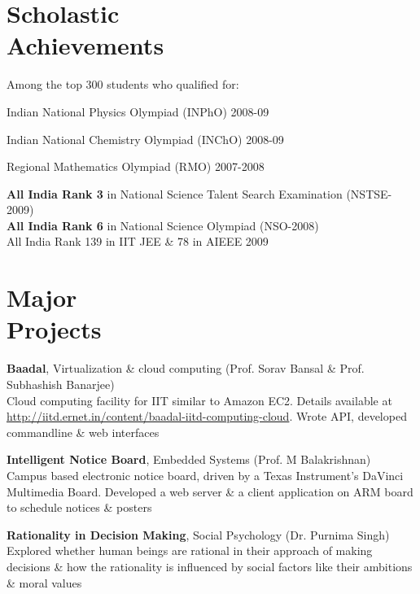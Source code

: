 \documentclass[margin,line]{resume}
\begin{document}
\begin{resume}
    \section{\mysidestyle Scholastic\\Achievements} 
    Among the top 300 students who qualified for:
    \begin{list2}
    \item Indian National Physics Olympiad (INPhO) 2008-09
    \item Indian National Chemistry Olympiad (INChO) 2008-09
    \item Regional Mathematics Olympiad (RMO) 2007-2008
    \end{list2}\vspace{-3.5mm}
    \textbf{All India Rank 3} in National Science Talent Search Examination (NSTSE-2009)\vspace{1mm}\\%
    \textbf{All India Rank 6} in National Science Olympiad (NSO-2008)\vspace{1mm}\\%
    All India Rank 139 in IIT JEE \& 78 in AIEEE 2009\vspace{-1.5mm}

    \section{\mysidestyle Major\\Projects}
    \textbf{Baadal}, Virtualization \& cloud computing \hfill(Prof. Sorav Bansal \& Prof. Subhashish Banarjee)
    \\ Cloud computing facility for IIT similar to Amazon EC2. Details available at \url{http://iitd.ernet.in/content/baadal-iitd-computing-cloud}. Wrote API, developed commandline \& web interfaces

    \textbf{Intelligent Notice Board}, Embedded Systems \hfill(Prof. M Balakrishnan)
    \\ Campus based electronic notice board, driven by a Texas Instrument's DaVinci Multimedia Board. Developed a web server \& a client application on ARM board to schedule notices \& posters

    \textbf{Rationality in Decision Making}, Social Psychology                     \hfill(Dr. Purnima Singh)
    \\ Explored whether human beings are rational in their approach of making decisions \& how the rationality is influenced by social factors like their ambitions \& moral values


\end{resume}
\end{document}
